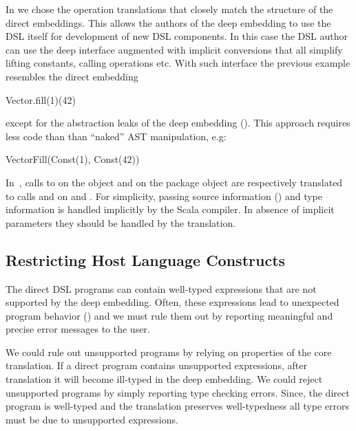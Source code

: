 In \yy we chose the operation translations that closely match the structure of
 the direct embeddings. This allows the authors of the deep embedding to use the
 DSL itself for development of new DSL components. In this case the DSL author can use
 the deep interface augmented with implicit conversions that all simplify lifting constants,
 calling operations etc. With such interface the previous example resembles the direct embedding\begin{lstparagraph}
Vector.fill(1)(42)
\end{lstparagraph}
except for the abstraction leaks of the deep embedding ().
This approach requires less code than than ``naked'' AST manipulation, e.g:\begin{lstparagraph}
VectorFill(Const(1), Const(42))
\end{lstparagraph}


 In~, calls to  on the object
  and  on the package object 
 are respectively translated to calls  and  on
  and . For simplicity, passing source
 information () and type information  is
 handled implicitly by the Scala compiler. In absence of implicit parameters
 they should be handled by the translation.

\subsection{Restricting Host Language Constructs}
\label{sec:restricting}
The direct DSL programs can contain well-typed expressions that are not
supported by the deep embedding. Often, these expressions lead to unexpected program
behavior () and we must rule them out by reporting meaningful and
precise error messages to the user.

We could rule out unsupported programs by relying on properties of the
core translation. If a direct program contains unsupported expressions, after
translation it will become ill-typed in the deep embedding. We could reject
unsupported programs by simply reporting type checking errors. Since, the
direct program is well-typed and the translation preserves well-typedness all
type errors must be due to unsupported expressions.

